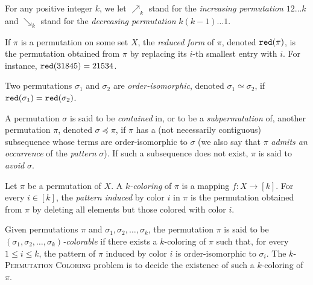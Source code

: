 \begin{definition}[Monotone]
	For any positive integer $k$,
  we let $\mathbf{\nearrow}_k$ stand for the
  \emph{increasing permutation} $1 2 \dots k$
  and $\mathbf{\searrow}_k$ stand for the \emph{decreasing permutation}
  $k (k-1) \dots 1$.
\end{definition}

\begin{definition}
    If $\pi$ is a permutation on some set $X$,
    the \emph{reduced form} of $\pi$, denoted $\operatorname{\texttt{red}}(\pi)$, is the permutation
    obtained from $\pi$ by replacing its $i$-th smallest entry
    with $i$.
    For instance, $\operatorname{\texttt{red}}(31845) = 21534$.
\end{definition}

\begin{definition}
    Two permutations $\sigma_1$ and $\sigma_2$ are \emph{order-isomorphic},
    denoted $\sigma_1 \simeq \sigma_2$,
    if $\operatorname{\texttt{red}}(\sigma_1) = \operatorname{\texttt{red}}(\sigma_2)$.
\end{definition}

\begin{definition}
    A permutation $\sigma$ is said to be \emph{contained} in, or to be
    a \emph{subpermutation} of, another permutation $\pi$, denoted
    $\sigma \preceq \pi$, if $\pi$ has a (not necessarily contiguous)
    subsequence whose terms are order-isomorphic to $\sigma$ (we also
    say that $\pi$ \emph{admits an occurrence} of the \emph{pattern}
    $\sigma$).
    If such a subsequence does not exist, $\pi$ is said to \emph{avoid}
    $\sigma$.
\end{definition}

\begin{definition}
  Let $\pi$ be a permutation of $X$.
  A \emph{$k$-coloring} of $\pi$ is a mapping $f : X \to [k]$.
  For every $i \in [k]$, the \emph{pattern induced} by color $i$ in $\pi$
  is the permutation obtained from $\pi$ by deleting all elements but
  those colored with color $i$.
\end{definition}

Given permutations $\pi$ and $\sigma_1, \sigma_2, \dots, \sigma_k$,
the permutation $\pi$ is said to be
\emph{$(\sigma_1, \sigma_2, \ldots, \sigma_k)$-colorable}
if there exists a
$k$-coloring of $\pi$ such that, for every $1 \leq i \leq k$, the
pattern of $\pi$ induced by color $i$ is order-isomorphic to $\sigma_i$.
The \textsc{$k$-Permutation Coloring} problem is to decide the existence of
such a $k$-coloring of $\pi$.

